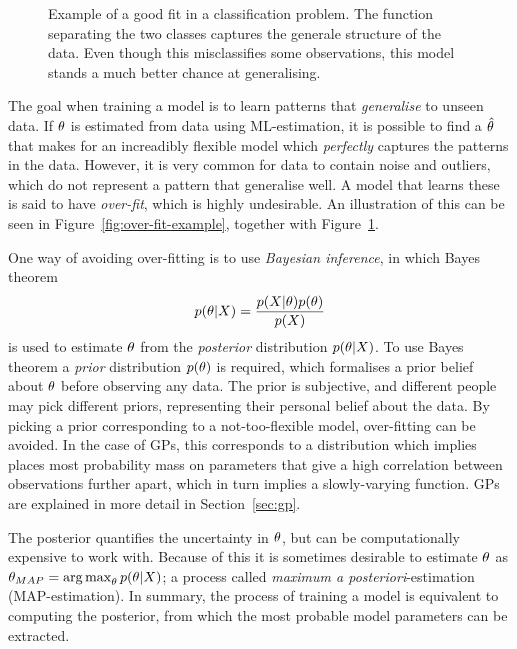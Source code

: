 \begin{figure}
\begin{minipage}{.46\textwidth}
    \caption{Example of a good fit in a classification problem. The
      function separating the two classes captures the generale structure of the
      data. Even though this misclassifies some observations, this
      model stands a much better chance at generalising.}\label{fig:good-fit-example}
  \end{minipage}
\end{figure}

The goal when training a model is to learn patterns that
\textit{generalise} to unseen data. If $\theta$ is estimated
from data using ML-estimation, it is possible to find a $\hat{\theta}$ that
makes for an increadibly flexible model which \textit{perfectly}
captures the patterns in the data. However, it is very common for data
to contain noise and outliers, which do not represent a pattern that
generalise well. A model that learns these is said to have
\textit{over-fit}, which is highly undesirable. An illustration of
this can be seen in Figure~\ref{fig:over-fit-example}, together with Figure~\ref{fig:good-fit-example}.

One way of avoiding over-fitting is to use \textit{Bayesian inference}, in which 
Bayes theorem
\begin{equation}
  \label{eq:bayes}
  p(\theta \vert X) = \frac{p(X \vert \theta) p(\theta)}{p(X)}
\end{equation}
is used to estimate $\theta$ from the \textit{posterior}
distribution $p(\theta \vert X)$. 
To use Bayes theorem a \textit{prior} distribution $p(\theta)$ is required, which formalises
a prior belief about $\theta$ before observing any data. The prior is
subjective, and different people may pick different priors,
representing their personal belief about the data. By picking a
prior corresponding to a not-too-flexible model, over-fitting can be
avoided. In the case of GPs, this corresponds to a distribution which
implies places most probability mass on parameters that give 
a high correlation between observations further
apart, which in turn implies a slowly-varying function. GPs are
explained in more detail in Section~\ref{sec:gp}.

The posterior quantifies the uncertainty in $\theta$, but can be computationally
expensive to work with. Because of this it is sometimes desirable to
estimate $\theta$ as $\theta_{MAP} = \operatorname*{arg\,max}_\theta
p (\theta \vert X)$; a process called \textit{maximum a posteriori}-estimation (MAP-estimation).
In summary, the process of training a model is equivalent to computing
the posterior, from which the most probable model parameters can be
extracted. 

